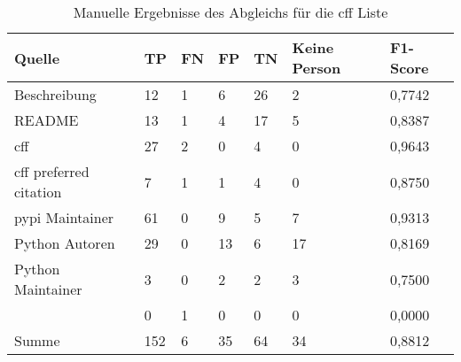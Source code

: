 \begin{table}[H]
    \centering
    \begin{tabularx}{\textwidth}{XR{.7cm}R{.7cm}R{.7cm}R{.7cm}R{2.8cm}R{2cm}}
        \toprule
        \textbf{Quelle} & \textbf{TP} & \textbf{FN} & \textbf{FP} & \textbf{TN} & \textbf{Keine Person} & \textbf{F1-Score} \\ \midrule
        Beschreibung                 & 12 & 1  & 6  & 26 & 2  & 0,7742 \\
        README                       & 13 & 1  & 4  & 17 & 5  & 0,8387 \\
        \gls{cff}                    & 27 & 2  & 0  & 4  & 0  & 0,9643\\
        \gls{cff} preferred citation & 7  & 1  & 1  & 4  & 0  & 0,8750 \\
        \gls{pypi} Maintainer        & 61 & 0  & 9  & 5  & 7  & 0,9313 \\
        Python Autoren               & 29 & 0  & 13 & 6  & 17 & 0,8169 \\
        Python Maintainer            & 3  & 0  & 2  & 2  & 3  & 0,7500 \\
                      & 0  & 1  & 0  & 0  & 0  & 0,0000 \\ \midrule
        Summe                        & 152 & 6 & 35 & 64 & 34 & 0,8812 \\
        \bottomrule
    \end{tabularx}
    \caption{Manuelle Ergebnisse des Abgleichs für die \gls{cff} Liste}
    \label{tab:cff_matching_results_manual_anhang}
\end{table}


